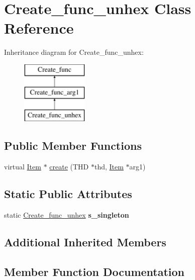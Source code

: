 \hypertarget{classCreate__func__unhex}{}\section{Create\+\_\+func\+\_\+unhex Class Reference}
\label{classCreate__func__unhex}
Inheritance diagram for Create\+\_\+func\+\_\+unhex\+:\begin{figure}[H]
\begin{center}
\leavevmode
\includegraphics[height=3.000000cm]{classCreate__func__unhex}
\end{center}
\end{figure}
\subsection*{Public Member Functions}
\begin{DoxyCompactItemize}
\item 
virtual \mbox{\hyperlink{classItem}{Item}} $\ast$ \mbox{\hyperlink{classCreate__func__unhex_ae7ac8afad18ee53c56b99200535da64a}{create}} (T\+HD $\ast$thd, \mbox{\hyperlink{classItem}{Item}} $\ast$arg1)
\end{DoxyCompactItemize}
\subsection*{Static Public Attributes}
\begin{DoxyCompactItemize}
\item 
\mbox{\label{classCreate__func__unhex_a63932fcc5cf1feeb6d457b02173357d7}} 
static \mbox{\hyperlink{classCreate__func__unhex}{Create\+\_\+func\+\_\+unhex}} {\bfseries s\+\_\+singleton}
\end{DoxyCompactItemize}
\subsection*{Additional Inherited Members}


\subsection{Member Function Documentation}
\mbox{\label{classCreate__func__unhex_ae7ac8afad18ee53c56b99200535da64a}} 
